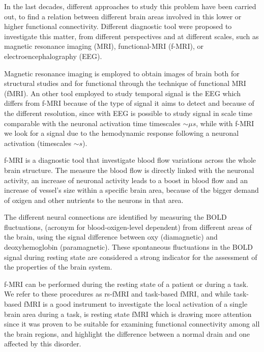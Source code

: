 \documentclass[10pt]{report}
\begin{document}
In the last decades, different approaches to study this problem have been carried out, to find a relation between different brain areas involved in this lower or higher functional connectivity.
Different diagnostic tool were proposed to investigate this matter, from different perspectives and at different scales, such as magnetic resonance imaging (MRI), functional-MRI (f-MRI), or electroencephalography (EEG).

Magnetic resonance imaging is employed to obtain images of brain both for structural studies and for functional through the  technique of functional MRI (fMRI).
An other tool employed to study temporal signal is the EEG which differs from f-MRI because of the type of signal it aims to detect and because of the different resolution, since with EEG is possible to study signal in scale time comparable with the neuronal activation time timescales $\sim \mu s$, while with f-MRI we look for a signal due to the hemodynamic response following a neuronal activation (timescales $\sim s$).


f-MRI is a diagnostic tool that investigate blood flow variations across the whole brain structure.
The measure the blood flow is directly linked with the neuronal activity, an increase of neuronal activity leads to a boost in blood flow and an increase of vessel's size within a specific brain area, because of the bigger demand of oxigen and other nutrients to the neurons in that area.

The different neural connections are identified by measuring the BOLD fluctuations, (acronym for blood-oxigen-level dependent) from different areas of the brain, using the signal difference between oxy (diamagnetic) and deoxyhemoglobin (paramagnetic).
These spontaneous fluctuations in the BOLD signal during resting state are considered a strong indicator for the assessment of the properties of the brain system.

f-MRI can be performed during the resting state of a patient or during a task. We refer to these procedures as rs-fMRI and task-based fMRI, and while task-based fMRI is a good instrument to investigate the local activation of a single brain area during a task, is resting state fMRI which is drawing more attention since it was proven to be suitable for examining functional connectivity among all the brain regions, and highlight the difference between a normal drain and one affected by this disorder.
\end{document}
